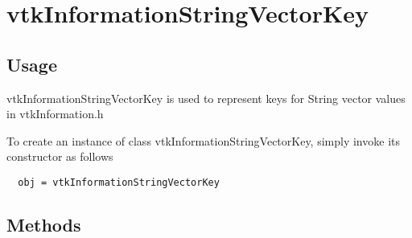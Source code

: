 \section{vtkInformationStringVectorKey}

\subsection{Usage}

 vtkInformationStringVectorKey is used to represent keys for String
 vector values in vtkInformation.h

To create an instance of class vtkInformationStringVectorKey, simply
invoke its constructor as follows
\begin{verbatim}
  obj = vtkInformationStringVectorKey
\end{verbatim}
\subsection{Methods}

